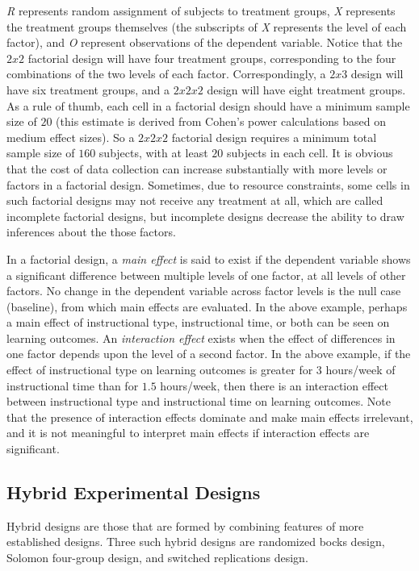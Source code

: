 \textit{R} represents random assignment of subjects to treatment groups, \textit{X} represents the treatment groups themselves (the subscripts of \textit{X} represents the level of each factor), and \textit{O} represent observations of the dependent variable. Notice that the $ 2 x 2 $ factorial design will have four treatment groups, corresponding to the four combinations of the two levels of each factor. Correspondingly, a $ 2 x 3 $ design will have six treatment groups, and a $ 2 x 2 x 2 $ design will have eight treatment groups. As a rule of thumb, each cell in a factorial design should have a minimum sample size of $ 20 $ (this estimate is derived from Cohen's power calculations based on medium effect sizes). So a $ 2 x 2 x 2 $ factorial design requires a minimum total sample size of $ 160 $ subjects, with at least $ 20 $ subjects in each cell. It is obvious that the cost of data collection can increase substantially with more levels or factors in a factorial design. Sometimes, due to resource constraints, some cells in such factorial designs may not receive any treatment at all, which are called incomplete factorial designs, but incomplete designs decrease the ability to draw inferences about the those factors.

In a factorial design, a \textit{main effect} is said to exist if the dependent variable shows a significant difference between multiple levels of one factor, at all levels of other factors. No change in the dependent variable across factor levels is the null case (baseline), from which main effects are evaluated. In the above example, perhaps a main effect of instructional type, instructional time, or both can be seen on learning outcomes. An \textit{interaction effect} exists when the effect of differences in one factor depends upon the level of a second factor. In the above example, if the effect of instructional type on learning outcomes is greater for $ 3 $ hours/week of instructional time than for $ 1.5 $ hours/week, then there is an interaction effect between instructional type and instructional time on learning outcomes. Note that the presence of interaction effects dominate and make main effects irrelevant, and it is not meaningful to interpret main effects if interaction effects are significant.

\subsection{Hybrid Experimental Designs}

Hybrid designs are those that are formed by combining features of more established designs. Three such hybrid designs are randomized bocks design, Solomon four-group design, and switched replications design.

